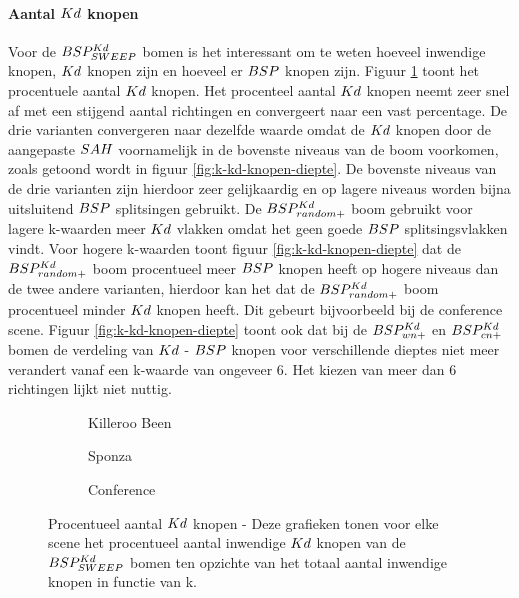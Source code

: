 \paragraph{Aantal $\symKd$ knopen}
Voor de $BSP^{Kd}_{SWEEP}$ bomen is het interessant om te weten hoeveel inwendige knopen, $\symKd$ knopen zijn en hoeveel er $BSP$ knopen zijn.
Figuur \ref{fig:k-kd-knopen} toont het procentuele aantal $\symKd$ knopen.
Het procenteel aantal $\symKd$ knopen neemt zeer snel af met een stijgend aantal richtingen en convergeert naar een vast percentage.
De drie varianten convergeren naar dezelfde waarde omdat de $\symKd$ knopen door de aangepaste $SAH$ voornamelijk in de bovenste niveaus van de boom voorkomen, zoals getoond wordt in figuur \ref{fig:k-kd-knopen-diepte}.
De bovenste niveaus van de drie varianten zijn hierdoor zeer gelijkaardig en op lagere niveaus worden bijna uitsluitend $BSP$ splitsingen gebruikt.
De $BSP^{Kd}_{random+}$ boom gebruikt voor lagere k-waarden meer $\symKd$ vlakken omdat het geen goede $BSP$ splitsingsvlakken vindt.
Voor hogere k-waarden toont figuur \ref{fig:k-kd-knopen-diepte} dat de $BSP^{Kd}_{random+}$ boom procentueel meer $BSP$ knopen heeft op hogere niveaus dan de twee andere varianten, hierdoor kan het dat de $BSP^{Kd}_{random+}$ boom procentueel minder $\symKd$ knopen heeft.
Dit gebeurt bijvoorbeeld bij de conference scene.
Figuur \ref{fig:k-kd-knopen-diepte} toont ook dat bij de $BSP^{Kd}_{wn+}$ en $BSP^{Kd}_{cn+}$ bomen de verdeling van $\symKd$ - $BSP$ knopen voor verschillende dieptes niet meer verandert vanaf een k-waarde van ongeveer 6.
Het kiezen van meer dan 6 richtingen lijkt niet nuttig.

\begin{figure}[h]
  \centering
  \begin{subfigure}[t]{.32\linewidth}
    \centering
{}
\caption{Killeroo Been}
  \end{subfigure}
  \begin{subfigure}[t]{.32\linewidth}
    \centering
{}
\caption{Sponza}
\end{subfigure}
\begin{subfigure}[t]{.32\linewidth}
  \centering
{}
\caption{Conference}
\end{subfigure}
\caption[Procentueel aantal $\symKd$ knopen]{Procentueel aantal $\symKd$ knopen - \small Deze grafieken tonen voor elke scene het procentueel aantal inwendige $\symKd$ knopen van de $BSP^{Kd}_{SWEEP}$ bomen ten opzichte van het totaal aantal inwendige knopen in functie van k.}
\label{fig:k-kd-knopen}
\end{figure}

